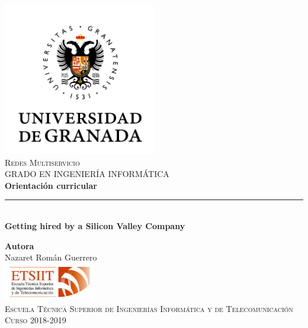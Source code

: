 \documentclass[11pt,a4paper]{article}
\begin{document}
\begin{titlepage}

\begin{minipage}{\textwidth}

\centering
\includegraphics[width=0.5\textwidth]{img/logo.png}\\

\textsc{\Large Redes Multiservicio\\[0.2cm]}
\textsc{GRADO EN INGENIERÍA INFORMÁTICA}\\[1cm]

{\Huge\bfseries Orientación curricular\\}
\noindent\rule[-1ex]{\textwidth}{3pt}\\[3.5ex]
{\large\bfseries Getting hired by a Silicon Valley Company}
\end{minipage}

\vspace{1.5cm}
\begin{minipage}{\textwidth}
\centering

\textbf{Autora}\\ {Nazaret Román Guerrero}\\[2.5ex]
\includegraphics[width=0.3\textwidth]{img/etsiit.jpeg}\\[0.1cm]
\vspace{1cm}
\textsc{Escuela Técnica Superior de Ingenierías Informática y de Telecomunicación}\\
\vspace{1cm}
\textsc{Curso 2018-2019}
\end{minipage}
\end{titlepage}

\end{document}
